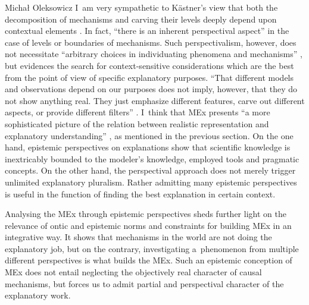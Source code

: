 \begin{artengenv}{Michał Oleksowicz}
I~am very sympathetic to Kästner's view that both the decomposition of mechanisms and carving their levels deeply depend upon contextual elements
\parencite[][pp.217–220]{woodward_comment_2008}. %
 In fact, ``there is an inherent perspectival aspect'' 
\parencite[][p.960]{darden_thinking_2008} %
 in the case of levels or boundaries of mechanisms. Such perspectivalism, however, does not necessitate ``arbitrary choices in individuating phenomena and mechanisms'' 
\parencite[][p.960]{darden_thinking_2008}, %
 but evidences the search for context-sensitive considerations which are the best from the point of view of specific explanatory purposes. ``That different models and observations depend on our purposes does not imply, however, that they do not show anything real. They just emphasize different features, carve out different aspects, or provide different filters'' 
\parencite[][p.76]{kastner_integrating_2018}. %
 I~think that MEx presents ``a more sophisticated picture of the relation between realistic representation and explanatory understanding'' 
\parencite[][p.3795]{de_regt_scientific_2015}, %
 as mentioned in the previous section. On the one hand, epistemic perspectives on explanations show that scientific knowledge is inextricably bounded to the modeler's knowledge, employed tools and pragmatic concepts. On the other hand, the perspectival approach does not merely trigger unlimited explanatory pluralism. Rather admitting many epistemic perspectives is useful in the function of finding the best explanation in certain context.

Analysing the MEx through epistemic perspectives sheds further light on the relevance of ontic and epistemic norms and constraints for building MEx in an integrative way. It shows that mechanisms in the world are not doing the explanatory job, but on the contrary, investigating a~phenomenon from multiple different perspectives is what builds the MEx. Such an epistemic conception of MEx does not entail neglecting the objectively real character of causal mechanisms, but forces us to admit partial and perspectival character of the explanatory work.


\end{artengenv}
